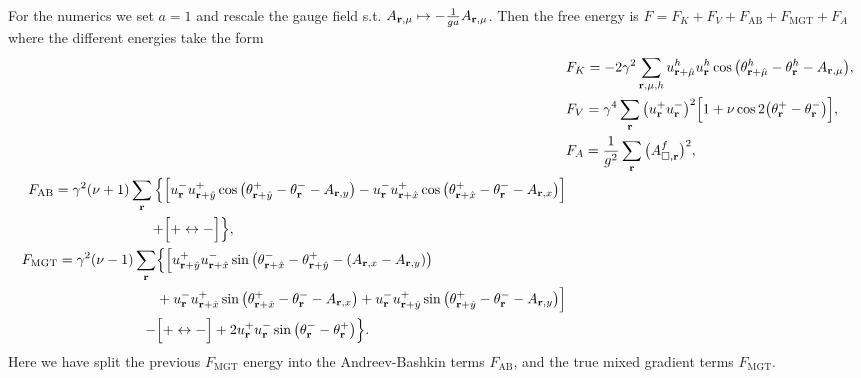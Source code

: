 For the numerics we set $a=1$ and rescale the gauge field s.t. $A_{\v{r},\mu} \mapsto -\frac{1}{ga}A_{\v{r},\mu}$. Then the free energy is $F = F_K + F_V + F_\text{AB} + F_\text{MGT} + F_A$ where
the different energies take the form
\begin{align}
  &F_K = -2\gamma^2\sum_{\v{r},\mu,h}u_{\v{r}+\hat{\mu}}^hu_\v{r}^h\cos\big(\theta_{\v{r}+\hat{\mu}}^h-\theta_\v{r}^h - A_{\v{r},\mu}\big),\label{eq:disc:cp1:rescale:FK}\\
  &F_V = \gamma^4\sum_\v{r}\big(u_\v{r}^+u_\v{r}^-\big)^2\Big[1+\nu\cos2\big(\theta_\v{r}^+ - \theta_\v{r}^-\big)\Big], \label{eq:disc:cp1:rescale:FV}\\
  &F_A = \frac{1}{g^2}\sum_\v{r}\big(A_{\Box,\v{r}}^f\big)^2, \label{eq:disc:cp1:rescale:FA}\\
  \begin{split}
	F_\text{AB} = \gamma^2(\nu+1)\sum_\v{r}\Big\{&\Big[u_\v{r}^-u_{\v{r}+\hat{y}}^+\cos\big(\theta_{\v{r}+\hat{y}}^+ - \theta_\v{r}^- - A_{\v{r},y}\big) 
  - u_\v{r}^-u_{\v{r}+\hat{x}}^+\cos\big(\theta_{\v{r}+\hat{x}}^+-\theta_\v{r}^--A_{\v{r},x}\big)\Big]\\ + &\Big[+\leftrightarrow-\Big]\Big\},
\end{split}\label{eq:disc:cp1:rescale:FAB}\\
  \begin{split}
	F_\text{MGT} = \gamma^2(\nu-1)\sum_\v{r}&\Big\{\Big[u_{\v{r}+\hat{y}}^+u_{\v{r}+\hat{x}}^-\sin\big(\theta_{\v{r}+\hat{x}}^--\theta_{\v{r}+\hat{y}}^+ - (A_{\v{r},x}-A_{\v{r},y})\big)\\
	&+ u_\v{r}^-u_{\v{r}+\hat{x}}^+\sin\big(\theta_{\v{r}+\hat{x}}^+-\theta_\v{r}^--A_{\v{r},x}\big) + u_\v{r}^-u_{\v{r}+\hat{y}}^+\sin\big(\theta_{\v{r}+\hat{y}}^+-\theta_\v{r}^--A_{\v{r},y}\big)\Big]\\
	- &\Big[+\leftrightarrow-\Big] + 2u_\v{r}^+u_\v{r}^-\sin\big(\theta_\v{r}^--\theta_\v{r}^+\big)\Big\}.
  \end{split}\label{eq:disc:cp1:rescale:FMGT}
\end{align}
Here we have split the previous $F_\text{MGT}$ energy into the Andreev-Bashkin terms $F_\text{AB}$, and the true mixed gradient terms $F_\text{MGT}$.
